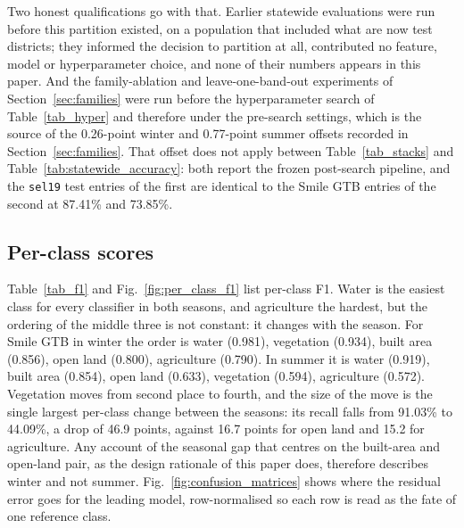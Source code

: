 \documentclass[conference]{IEEEtran}
\begin{document}
Two honest qualifications go with that. Earlier statewide evaluations were run before this partition existed, on a population that included what are now test districts; they informed the decision to partition at all, contributed no feature, model or hyperparameter choice, and none of their numbers appears in this paper. And the family-ablation and leave-one-band-out experiments of Section~\ref{sec:families} were run before the hyperparameter search of Table~\ref{tab_hyper} and therefore under the pre-search settings, which is the source of the 0.26-point winter and 0.77-point summer offsets recorded in Section~\ref{sec:families}. That offset does not apply between Table~\ref{tab_stacks} and Table~\ref{tab:statewide_accuracy}: both report the frozen post-search pipeline, and the \texttt{sel19} test entries of the first are identical to the Smile GTB entries of the second at 87.41\% and 73.85\%.

\subsection{Per-class scores}
Table~\ref{tab_f1} and Fig.~\ref{fig:per_class_f1} list per-class F1. Water is the easiest class for every classifier in both seasons, and agriculture the hardest, but the ordering of the middle three is not constant: it changes with the season. For Smile GTB in winter the order is water (0.981), vegetation (0.934), built area (0.856), open land (0.800), agriculture (0.790). In summer it is water (0.919), built area (0.854), open land (0.633), vegetation (0.594), agriculture (0.572). Vegetation moves from second place to fourth, and the size of the move is the single largest per-class change between the seasons: its recall falls from 91.03\% to 44.09\%, a drop of 46.9 points, against 16.7 points for open land and 15.2 for agriculture. Any account of the seasonal gap that centres on the built-area and open-land pair, as the design rationale of this paper does, therefore describes winter and not summer. Fig.~\ref{fig:confusion_matrices} shows where the residual error goes for the leading model, row-normalised so each row is read as the fate of one reference class.
\end{document}
